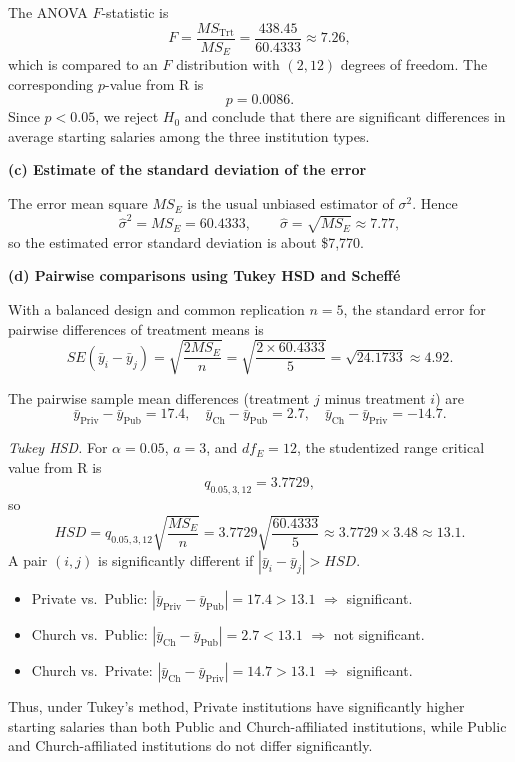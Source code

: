 \documentclass[answers,12pt,addpoints]{exam}
\begin{document}
The ANOVA $F$-statistic is
\[
F = \frac{MS_{\text{Trt}}}{MS_E}
= \frac{438.45}{60.4333} \approx 7.26,
\]
which is compared to an $F$ distribution with $(2,12)$ degrees of freedom.
The corresponding $p$-value from R is
\[
p = 0.0086.
\]
Since $p < 0.05$, we reject $H_0$ and conclude that there are significant
differences in average starting salaries among the three institution types.

\medskip
\textbf{(c) Estimate of the standard deviation of the error}

The error mean square $MS_E$ is the usual unbiased estimator of $\sigma^2$.
Hence
\[
\hat{\sigma}^2 = MS_E = 60.4333,
\qquad
\hat{\sigma} = \sqrt{MS_E} \approx 7.77,
\]
so the estimated error standard deviation is about \$7{,}770.

\medskip
\textbf{(d) Pairwise comparisons using Tukey HSD and Scheff\'e}

With a balanced design and common replication $n=5$, the standard error for
pairwise differences of treatment means is
\[
SE(\bar{y}_i - \bar{y}_j) =
\sqrt{\frac{2 MS_E}{n}}
= \sqrt{\frac{2 \times 60.4333}{5}}
= \sqrt{24.1733} \approx 4.92.
\]

The pairwise sample mean differences (treatment $j$ minus treatment $i$) are
\[
\bar{y}_{\text{Priv}} - \bar{y}_{\text{Pub}} = 17.4,\quad
\bar{y}_{\text{Ch}}   - \bar{y}_{\text{Pub}} = 2.7,\quad
\bar{y}_{\text{Ch}}   - \bar{y}_{\text{Priv}} = -14.7.
\]

\emph{Tukey HSD.}
For $\alpha = 0.05$, $a = 3$, and $df_E = 12$, the studentized range critical
value from R is
\[
q_{0.05,3,12} = 3.7729,
\]
so
\[
HSD = q_{0.05,3,12}\sqrt{\frac{MS_E}{n}}
= 3.7729 \sqrt{\frac{60.4333}{5}}
\approx 3.7729 \times 3.48 \approx 13.1.
\]
A pair $(i,j)$ is significantly different if $|\bar{y}_i - \bar{y}_j| > HSD$.

\begin{itemize}
  \item Private vs.\ Public:
  $|\bar{y}_{\text{Priv}} - \bar{y}_{\text{Pub}}|
  = 17.4 > 13.1$ $\Rightarrow$ significant.
  \item Church vs.\ Public:
  $|\bar{y}_{\text{Ch}} - \bar{y}_{\text{Pub}}|
  = 2.7 < 13.1$ $\Rightarrow$ not significant.
  \item Church vs.\ Private:
  $|\bar{y}_{\text{Ch}} - \bar{y}_{\text{Priv}}|
  = 14.7 > 13.1$ $\Rightarrow$ significant.
\end{itemize}

Thus, under Tukey's method, Private institutions have significantly higher
starting salaries than both Public and Church-affiliated institutions, while
Public and Church-affiliated institutions do not differ significantly.
\end{document}

